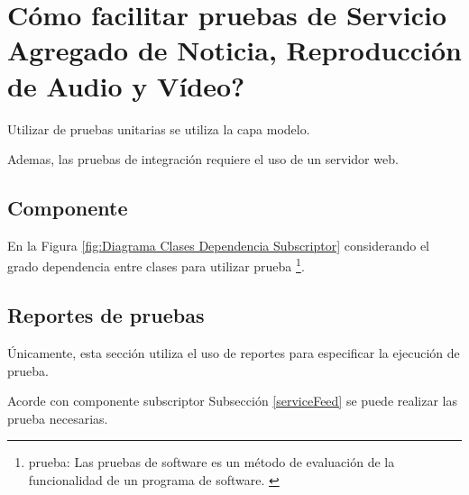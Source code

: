 \section{\textquestiondown Cómo facilitar pruebas de Servicio Agregado de Noticia, Reproducción de Audio y Vídeo?}

Utilizar de pruebas unitarias se utiliza la capa modelo.

Ademas, las pruebas de integración requiere el uso de un servidor web. 


\subsection{Componente}

En la Figura \ref{fig:Diagrama Clases Dependencia Subscriptor} considerando
el grado dependencia entre clases para utilizar prueba \footnote{prueba:
Las pruebas de software es un método de evaluación de la funcionalidad de un 
programa de software. \cite{test}}.

\begin{minipage}{1.0\textwidth}
	\centering
	\label{fig:Diagrama Clases Dependencia Subscriptor}
\end{minipage}


\subsection{Reportes de pruebas}

Únicamente, esta sección utiliza el uso de reportes para especificar la
ejecución de prueba.

Acorde con componente subscriptor Subsección \ref{serviceFeed} se puede
realizar las prueba necesarias.

